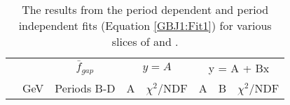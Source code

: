 \begin{table}
\footnotesize 
\centering
\begin{tabular}{ | c | c | c | c | c | c | c | c | }
\hline
\hline
\dy{} & \ptb{} & $\bar{f}_{gap}$&\multicolumn{2}{|c|}{$y = A$} & \multicolumn{3}{|c|}{y = A + Bx}\\
   & GeV& Periods B-D &A&$\chi^{2}$/NDF&A&B&$\chi^{2}$/NDF\\
\hline

\hline
\hline
\end{tabular}
\caption[Results from period dependent and period independent fits to the average gap fraction as a function of period]{
The results from the period dependent and period independent fits (Equation \ref{GBJ1:Fit1}) for various slices of \dy{} and \ptb{}.
\label{GBJ1:GFAveTable}}
\end{table}

